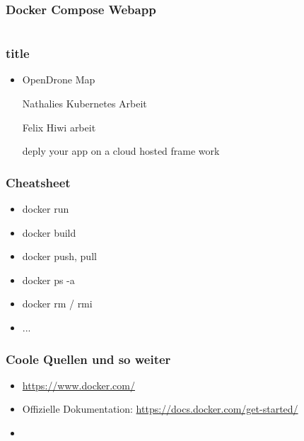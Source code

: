 \documentclass[22pt]{beamer}
\begin{document}
\begin{frame}[fragile]
    \frametitle{Docker Compose Webapp}
    \inputminted[fontsize=\footnotesize, frame=lines]{dockerfile}{../examples/Dockerfile.cmd}
\end{frame}

\begin{frame}[t]
    \frametitle{title}
    \begin{itemize}
        \item OpenDrone Map
        \item [Nathalies Kubernetes Arbeit]
        \item [Felix Hiwi arbeit]
        \item [deply your app on a cloud hosted frame work]
    \end{itemize}
\end{frame}

\begin{frame}[t]
    \frametitle{Cheatsheet}
    \begin{itemize}
        \item docker run
        \item docker build
        \item docker push, pull
        \item docker ps -a
        \item docker rm / rmi
        \item ...
    \end{itemize} 
\end{frame}

\begin{frame}[t]
    \frametitle{Coole Quellen und so weiter}
    \begin{itemize}
        \item \href{https://www.docker.com/}{https://www.docker.com/}
        \item Offizielle Dokumentation: \href{https://docs.docker.com/get-started/}{https://docs.docker.com/get-started/}
        \item 
    \end{itemize} 
\end{frame}
\end{document}

